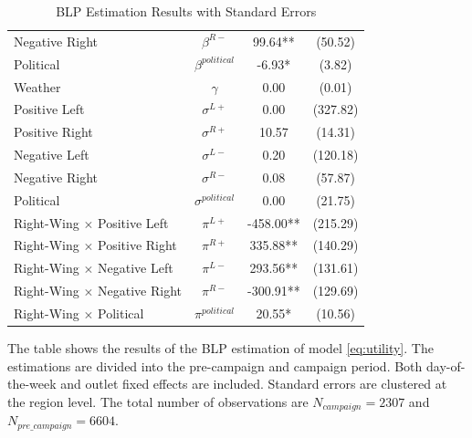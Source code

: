\documentclass[12pt]{article}
\begin{document}
\begin{table}[ht]
\begin{threeparttable}
\begin{tabular}{lccc}
			Negative Right & $\beta^{R-}$ & 99.64** & (50.52) \\
			Political & $\beta^{political}$ & -6.93* & (3.82) \\
			Weather & $\gamma$ & 0.00 & (0.01) \\
			\hline
			Positive Left & $\sigma^{L+}$ & 0.00 & (327.82) \\
			Positive Right & $\sigma^{R+}$ & 10.57 & (14.31) \\
			Negative Left & $\sigma^{L-}$ & 0.20 & (120.18) \\
			Negative Right & $\sigma^{R-}$ & 0.08 & (57.87) \\
			Political & $\sigma^{political}$ & 0.00 & (21.75) \\
			\hline
			Right-Wing $\times$  Positive Left & $\pi^{L+}$ & -458.00** & (215.29) \\
			Right-Wing $\times$  Positive Right & $\pi^{R+}$ & 335.88** & (140.29) \\
			Right-Wing $\times$  Negative Left & $\pi^{L-}$ & 293.56** & (131.61) \\
			Right-Wing $\times$  Negative Right & $\pi^{R-}$ & -300.91** & (129.69) \\
			Right-Wing $\times$  Political & $\pi^{political}$ & 20.55* & (10.56) \\
			\hline
			\hline
		\end{tabular}
		\caption{BLP Estimation Results with Standard Errors}
		\begin{tablenotes}
			\small
			\item \footnotesize{The table shows the results of the BLP estimation of model \ref{eq:utility}. The estimations are divided into the pre-campaign and campaign period. Both day-of-the-week and outlet fixed effects are included. Standard errors are clustered at the region level. The total number of observations are $N_{campaign}=2307$ and  $N_{pre\_campaign}=6604$.}
		\end{tablenotes}
	\end{threeparttable}
\end{table}
	
	
	
\end{document}
